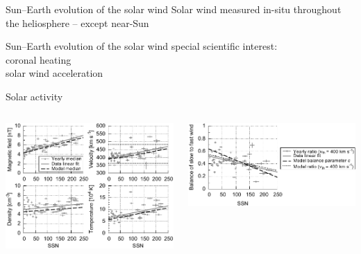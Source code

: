 \begin{frame}[c]{Sun--Earth evolution of the solar wind}{}
	Solar wind measured in-situ throughout the heliosphere -- except near-Sun
\end{frame}
\begin{frame}[c]{Sun--Earth evolution of the solar wind}{}
	special scientific interest:\\
	coronal heating\\
	solar wind acceleration
\end{frame}
\begin{frame}[c]{Solar activity}{}
	\begin{columns}[c]
		
		\includegraphics[width=\textwidth]{../figures_paper/OMNI_yearly_BVNTvsSSN_a.pdf}


		\includegraphics[width=\textwidth]{../figures_paper/Vdbl_SSN_ratio_f_plot.pdf}

	\end{columns}
\end{frame}

